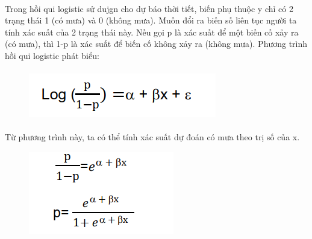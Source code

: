 \documentclass{article}
\begin{document}
\paragraph{}
Trong hồi qui logistic sử dujgn cho dự báo thời tiết, biến phụ thuộc y chỉ có 2 trạng thái 1 (có mưa) và 0 (không mưa). Muốn đổi ra biến số liên tục người ta tính xác suất của 2 trạng thái này. Nếu gọi p là xác suất để một biến cố xảy ra (có mưa), thì 1-p là xác suất để biến cố không xảy ra (không mưa). Phương trình hồi qui logistic phát biểu:
\paragraph{}
\begin{figure}[!h]
	\begin{center}
		\includegraphics[width=\linewidth]{images/CongThuc3.png}        
	\end{center}
\end{figure}
\paragraph{}
Từ phương trình này, ta có thể tính xác suất dự đoán có mưa theo trị số của x.

\begin{figure}[!h]
	\begin{center}
		\includegraphics[width=\linewidth]{images/CongThuc2.png}        
	\end{center}
\end{figure}
\pagebreak
\end{document}
